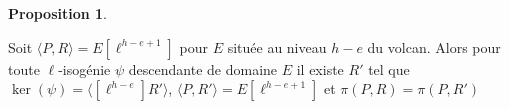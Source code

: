 \documentclass[10pt,a4paper]{beamer}
\theoremstyle{plain}
\theoremstyle{definition}
\theoremstyle{definition}
\theoremstyle{definition}
\newtheorem{prop}[thm]{Proposition}
\theoremstyle{definition}
\theoremstyle{remark}
\theoremstyle{remark}
\begin{document}
\begin{frame}

\begin{prop}
\label{pro:etu:atk:elk}

Soit $\langle P ,R \rangle = E[\ell^{h-e+1}]$ pour $E$ située au niveau $h-e$ 
du volcan. Alors pour toute $\ell$-isogénie $\psi$ descendante de domaine $E$ 
il existe $R'$ tel que $\ker(\psi)=\langle [\ell^{h-e}]R' \rangle$, $\langle P,R' 
\rangle = E[\ell^{h-e+1}]$ et $ \pi(P,R)= \pi(P,R') $
\end{prop}
\pause

\begin{figure}
\begin{center}

\begin{tikzpicture}[scale=0.290]


\end{tikzpicture}
\end{center}
\end{figure}
\end{frame}
\end{document}

